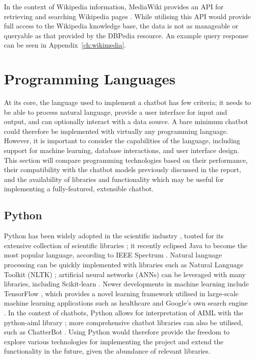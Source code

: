 In the context of Wikipedia information, MediaWiki provides an API for retrieving and searching Wikipedia pages \cite{mediawiki}. While utilising this API would provide full access to the Wikipedia knowledge base, the data is not as manageable or queryable as that provided by the DBPedia resource. An example query response can be seen in Appendix~\ref{ch:wikimedia}.

\newpage
\section{Programming Languages}
At its core, the language used to implement a chatbot has few criteria; it needs to be able to process natural language, provide a user interface for input and output, and can optionally interact with a data source. A bare minimum chatbot could therefore be implemented with virtually any programming language. However, it is important to consider the capabilities of the language, including support for machine learning, database interactions, and user interface design. This section will compare programming technologies based on their performance, their compatibility with the chatbot models previously discussed in the report, and the availability of libraries and functionality which may be useful for implementing a fully-featured, extensible chatbot.
 
\subsection{Python}
Python has been widely adopted in the scientific industry \cite{bird2009natural}, touted for its extensive collection of scientific libraries \cite{koepke2011python}; it recently eclipsed Java to become the most popular language, according to IEEE Spectrum \cite{cass2019}. Natural language processing can be quickly implemented with libraries such as Natural Language Toolkit (NLTK) \cite{nltk2019}; artificial neural networks (ANNs) can be leveraged with many libraries, including Scikit-learn \cite{pedregosa2011scikit}. Newer developments in machine learning include TensorFlow \cite{abadi2016tensorflow}, which provides a novel learning framework utilised in large-scale machine learning applications such as healthcare \cite{polzin2019} and Google’s own search engine \cite{pichai2015}. In the context of chatbots, Python allows for interpretation of AIML with the python-aiml library \cite{villegas2019}; more comprehensive chatbot libraries can also be utilised, such as ChatterBot \cite{cox2019}. Using Python would therefore provide the freedom to explore various technologies for implementing the project and extend the functionality in the future, given the abundance of relevant libraries.

